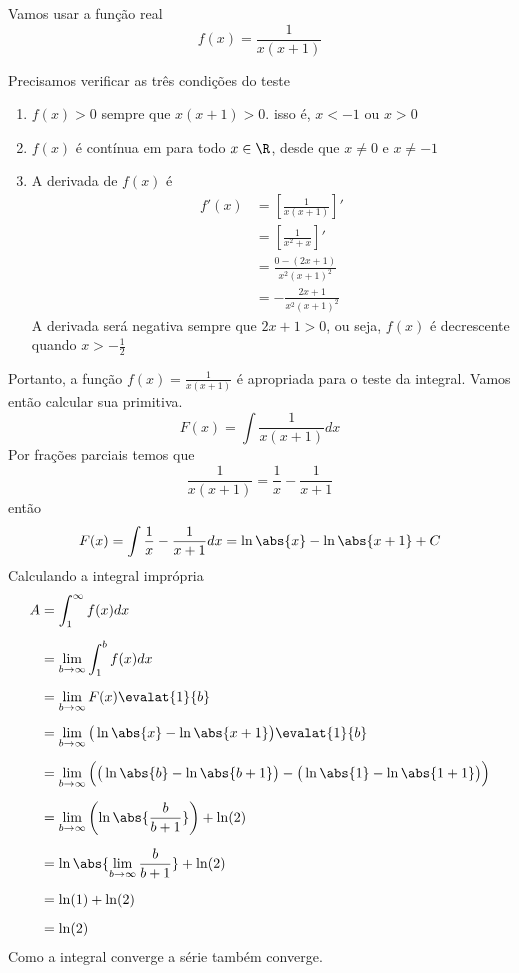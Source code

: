 \documentclass[a4paper,12pt,fleqn]{article}
\begin{document}
\begin{answer}
  Vamos usar a função real
  \[
    f(x) = \frac{1}{x(x+1)}
  \]

  Precisamos verificar as três condições do teste
  \begin{enumerate}[label=\roman*)]
    \item \(f(x)>0\) sempre que \(x(x+1) > 0\).
          isso é, $x<-1$ ou $x>0$

    \item \(f(x)\) é contínua em para todo $x\in\R$, desde que $x\neq 0$
          e $x\neq -1$

    \item A derivada de \(f(x)\) é
    \begin{align*}
      f'(x)
      & = \left[\frac{1}{x(x+1)}\right]' \\[2mm]
      & = \left[\frac{1}{x^2+x}\right]' \\[2mm]
      & = \frac{0-(2x+1)}{x^2(x+1)^2} \\[2mm]
      & = -\frac{2x+1}{x^2(x+1)^2}
    \end{align*}
    A derivada será negativa sempre que \(2x+1>0\), ou seja,
    \(f(x)\) é decrescente quando \(x>-\frac{1}{2}\)
  \end{enumerate}

  Portanto, a função \(f(x) = \frac{1}{x(x+1)}\) é apropriada para
  o teste da integral. Vamos então calcular sua primitiva.
  \[
    F(x) = \int \frac{1}{x(x+1)} dx
  \]
  Por frações parciais temos que
  \[
    \frac{1}{x(x+1)} = \frac{1}{x} - \frac{1}{x+1}
  \]
  então
  \[
    F(x)
    = \int \frac{1}{x} - \frac{1}{x+1} dx
    = \ln\abs{x} - \ln\abs{x+1} + C
  \]
  Calculando a integral imprópria
  \begin{align*}
    A
    & = \int_1^\infty f(x) dx \\[2mm]
    & = \lim_{b\to\infty}\int_1^b f(x)dx \\[2mm]
    & = \lim_{b\to\infty} F(x)\evalat{1}{b} \\[2mm]
    & = \lim_{b\to\infty} \big(\ln\abs{x} - \ln\abs{x+1}\big)\evalat{1}{b} \\[2mm]
    & = \lim_{b\to\infty}
        \Big(
          \big( \ln\abs{b} - \ln\abs{b+1}\big) -
          \big( \ln\abs{1} - \ln\abs{1+1}\big)
        \Big) \\[2mm]
    & = \lim_{b\to\infty} \left( \ln\abs{\frac{b}{b+1}}\right)
      + \ln(2) \\[2mm]
    & = \ln\abs{\lim_{b\to\infty} \frac{b}{b+1}}
      + \ln(2) \\[2mm]
    & = \ln(1)
      + \ln(2) \\[2mm]
    & = \ln(2)
  \end{align*}
  Como a integral converge a série também converge.
\end{answer}
\end{document}
